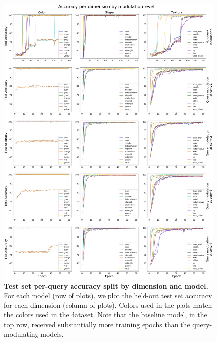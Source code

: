 \begin{figure}[!htb]
\centering
\includegraphics[width=\linewidth]{ch-results/figures/query_mod_simultaneous/query_mod_by_dimension.png}
\caption{ {\bf Test set per-query accuracy split by dimension and model.} For each model (row of plots), we plot the held-out test set accuracy for each dimension (column of plots). Colors used in the plots match the colors used in the dataset. Note that the baseline model, in the top row, received substantially more training epochs than the query-modulating models.}
\label{fig:results-query-mod-simultaneous-query-mod-by-dimension}
\end{figure}

